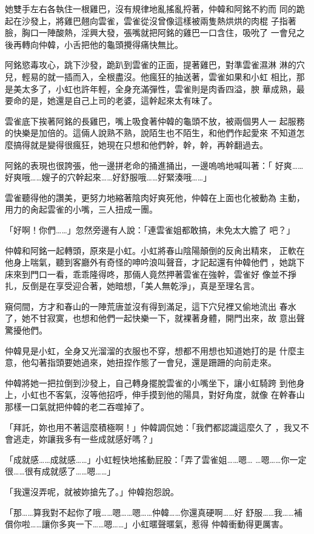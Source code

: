 她雙手左右各執住一根雞巴，沒有規律地亂搖亂捋著，仲韓和阿銘不約而
同的跪起在沙發上，將雞巴翹向雲雀，雲雀從沒曾像這樣被兩隻熱烘烘的肉棍
子指著臉，胸口一陣酸熱，淫興大發，張嘴就把阿銘的雞巴一口含住，吸吮了
一會兒之後再轉向仲韓，小舌把他的龜頭攪得痛快無比。

阿銘慾毒攻心，跳下沙發，跪趴到雲雀的正面，提著雞巴，對準雲雀濕淋
淋的穴兒，輕易的就一插而入，全根盡沒。他瘋狂的抽送著，雲雀如果和小虹
相比，那是美太多了，小虹也許年輕，全身充滿彈性，雲雀則是肉香四溢，腴
華成熟，最要命的是，她還是自己上司的老婆，這幹起來太有味了。

雲雀底下挨著阿銘的長雞巴，嘴上吸食著仲韓的龜頭不放，被兩個男人一
起服務的快樂是加倍的。這倆人說熟不熟，說陌生也不陌生，和他們作起愛來
不知道怎麼搞得就是變得很瘋狂，她現在只想和他們幹，幹，幹，再幹翻過去。

阿銘的表現也很誇張，他一邊拼老命的捅進捅出，一邊嗚嗚地喊叫著：「
好爽……好爽哦……嫂子的穴幹起來……好舒服哦……好緊湊哦……」

雲雀聽得他的讚美，更努力地縮著陰肉好爽死他，仲韓在上面也化被動為
主動，用力的肏起雲雀的小嘴，三人扭成一團。

「好啊！你們……」忽然旁邊有人說：「連雲雀姐都敢搞，未免太大膽了
吧？」

仲韓和阿銘一起轉頭，原來是小虹。小虹將春山陰陽顛倒的反肏出精來，
正軟在他身上喘氣，聽到客廳外有奇怪的呻吟浪叫聲音，才記起還有仲韓他們
，她跳下床來到門口一看，乖乖隆得咚，那倆人竟然押著雲雀在強幹，雲雀好
像並不掙扎，反倒是在享受迎合著，她暗想，「美人無乾淨」，真是至理名言。

窺伺間，方才和春山的一陣荒唐並沒有得到滿足，這下穴兒裡又偷地流出
春水了，她不甘寂寞，也想和他們一起快樂一下，就裸著身體，開門出來，故
意出聲驚擾他們。

仲韓見是小虹，全身又光溜溜的衣服也不穿，想都不用想也知道她打的是
什麼主意，他勾著指頭要她過來，她扭捏作態了一會兒，還是跚跚的向前走來。

仲韓將她一把拉倒到沙發上，自己轉身擺脫雲雀的小嘴坐下，讓小虹騎跨
到他身上，小虹也不客氣，沒等他招呼，伸手摸到他的陽具，對好角度，就像
在幹春山那樣一口氣就把仲韓的老二吞噬掉了。

「拜託，妳也用不著這麼積極啊！」仲韓調侃她：「我們都認識這麼久了
，我又不會逃走，妳讓我多有一些成就感好嗎？」

「成就感……成就感……」小虹輕快地搖動屁股：「弄了雲雀姐……嗯…
…嗯……你一定很……很有成就感了……嗯……」

「我還沒弄呢，就被妳搶先了。」仲韓抱怨說。

「那……算我對不起你了哦……嗯……嗯……仲韓……你還真硬啊……好
舒服……我……補償你啦……讓你多爽一下……嗯……」小虹暱聲暱氣，惹得
仲韓衝動得更厲害。

